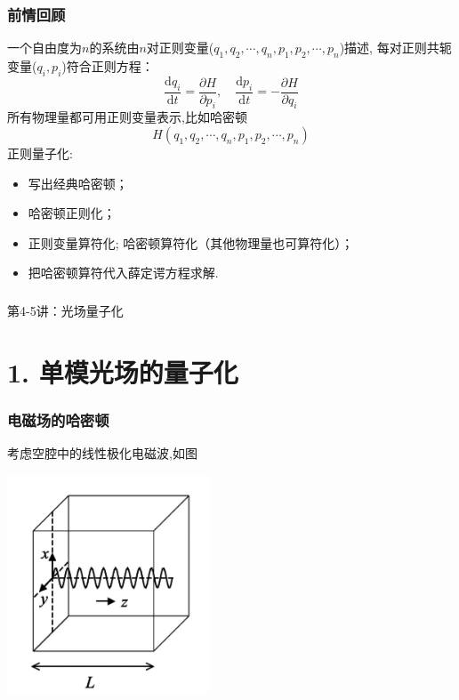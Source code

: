 \begin{frame}
    \frametitle{前情回顾}
    {\Bullet} 一个自由度为$n$的系统由$n$对正则变量($q_1, q_2, \cdots, q_n, p_1, p_2, \cdots, p_n$)描述, 每对正则共轭变量($q_i, p_i$)符合正则方程：
    \[ \frac{\mathrm{d} q_i }{\mathrm{d} t}  = \frac{\partial H }{\partial p_i}, \quad \frac{\mathrm{d} p_i }{\mathrm{d} t}  = - \frac{\partial H }{\partial q_i}\]
    所有物理量都可用正则变量表示,比如哈密顿\[H(q_1, q_2, \cdots, q_n, p_1, p_2, \cdots, p_n) \] 
    {\Bullet} 正则量子化: 
    \begin{itemize}
        \item 写出经典哈密顿；
        \item 哈密顿正则化；
        \item 正则变量算符化; 哈密顿算符化（其他物理量也可算符化）；
        \item 把哈密顿算符代入薛定谔方程求解.
    \end{itemize}     
\end{frame}

\begin{frame} [plain]
    \frametitle{}
    \Background[1] 
    \begin{center}
    {\huge 第4-5讲：光场量子化}
    \end{center}  
    \addtocounter{framenumber}{-1}   
\end{frame}


\section{1. 单模光场的量子化}

\begin{frame}
      \frametitle{电磁场的哈密顿}
    考虑空腔中的线性极化电磁波,如图 
    \begin{center}
     \includegraphics[width=0.45\textwidth]{figs/2022-04-27-12-37-33.png}
    \end{center}     
\end{frame}

